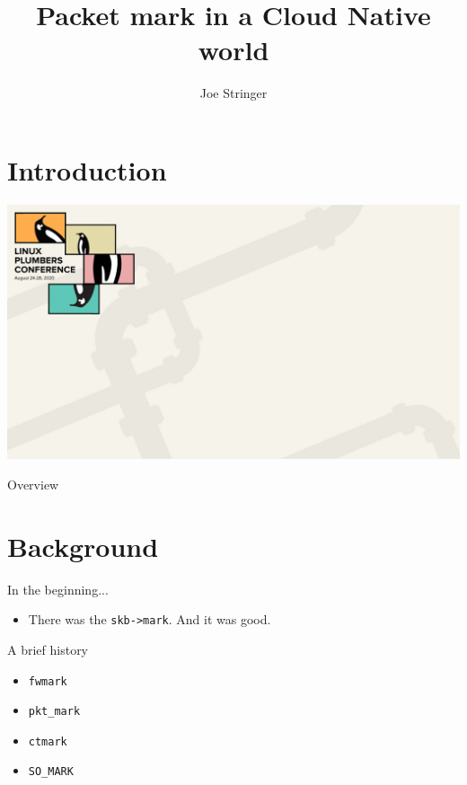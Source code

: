 \documentclass[black,white,aspectratio=169]{beamer}
\title[Packet mark in a Cloud Native world]{Packet mark in a Cloud Native world}
\institute{Cilium.io}
\author[Joe Stringer]{Joe Stringer}
\date[August 24, 2020]{}
\DeclareRobustCommand{\#}{\adjustbox{valign=B,totalheight=.57\baselineskip}{\oldhash}}%
\begin{document}
    \section*{Introduction}
    {
        \usebackgroundtemplate%
        {%
          \includegraphics[width=\paperwidth,height=\paperheight]{background.jpg}%
        }
        \begin{frame}[plain]
            \vspace*{8ex}
            \titlepage
        \end{frame}
    }

    \begin{frame}{Overview}
        \tableofcontents
    \end{frame}

    \section{Background}

    \begin{frame}[fragile]{In the beginning...}
        \begin{itemize}
            \item There was the \verb+skb->mark+. And it was good. \bigskip
        \end{itemize}
    \end{frame}

    \begin{frame}[fragile]{A brief history}
        \begin{itemize}
            \item \verb+fwmark+ \bigskip
            \item \verb+pkt_mark+ \bigskip
            \item \verb+ctmark+ \bigskip
            \item \verb+SO_MARK+ \bigskip
        \end{itemize}
    \end{frame}
\end{document}
